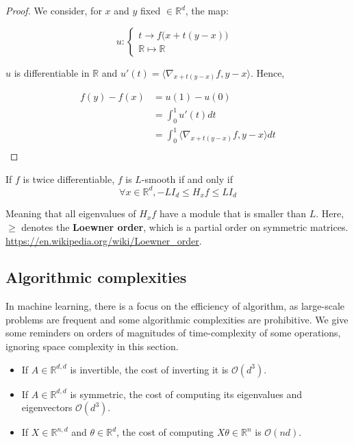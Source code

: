 \documentclass[
10pt, %
a4paper, %
oneside, %
headinclude,footinclude, %
BCOR5mm, %
]{scrartcl}
\begin{document}
\begin{proof}
    We consider, for $x$ and $y$ fixed $\in \mathbb{R}^d$, the map:

$$
u  : \left\{
    \begin{array}{ll}
	t\rightarrow f\big(x+t(y-x)\big) & \\
        \mathbb{R}  \mapsto \mathbb{R} & 
    \end{array}
\right.
$$

    $u$ is differentiable in $ \mathbb{R} $ and $u'(t) = \langle\nabla_{x+t(y-x)}f, y-x \rangle$. Hence, 

    \begin{equation}
	\begin{aligned}
	    \label{eq:}
	    f(y)-f(x) &= u(1)-u(0)\\
	    &= \int^{1}_{0} u'(t)  dt \\
	    &= \int^{1}_{0}  \langle\nabla_{x+t(y-x)}f, y-x \rangle dt \\
	\end{aligned}
    \end{equation}

\end{proof}

\begin{lemma}
    
    If $f$ is twice differentiable, $f$ is $L$-smooth if and only if
    \begin{equation*}
        \forall x\in \mathbb{R}^d, -LI_d\leq H_xf\leq LI_d
    \end{equation*}

	 Meaning that all eigenvalues of $H_xf$ have a module that is smaller than $L$. Here, $\geq$ denotes the \textbf{{Loewner order}}, which is a partial order on symmetric matrices. \url{https://en.wikipedia.org/wiki/Loewner_order}.
\end{lemma}

\subsection{\large\color{MidnightBlue}Algorithmic complexities}

In machine learning, there is a focus on the efficiency of algorithm, as large-scale problems are frequent and some algorithmic complexities are prohibitive. We give some reminders on orders of magnitudes of time-complexity of some operations, ignoring space complexity in this section.

\begin{itemize}
    \item If $A\in \mathbb{R}^{d, d}$ is invertible, the cost of inverting it is $ \mathcal{O} (d^3)$.
    \item If $A\in \mathbb{R}^{d, d}$ is symmetric, the cost of computing its eigenvalues and eigenvectors $ \mathcal{O} (d^3)$.
    \item If $X\in \mathbb{R}^{n,d}$ and $\theta\in \mathbb{R}^d$, the cost of computing $ X\theta\in \mathbb{R}^n$ is $ \mathcal{O} (nd)$.
\end{itemize}
\end{document}
